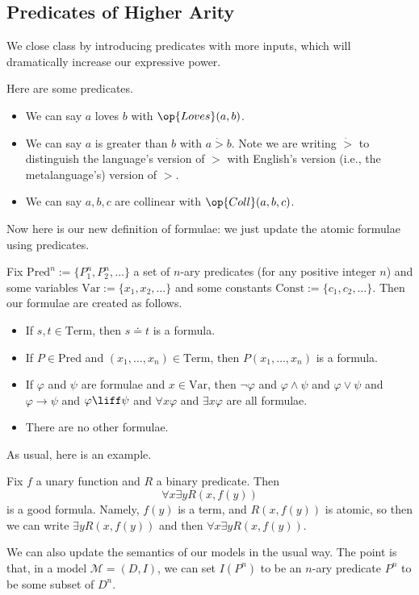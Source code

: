 \documentclass[../notes.tex]{subfiles}
\begin{document}
\subsection{Predicates of Higher Arity}
We close class by introducing predicates with more inputs, which will dramatically increase our expressive power.
\begin{example}
	Here are some predicates.
	\begin{itemize}
		\item We can say $a$ loves $b$ with $\op{Loves}(a,b)$.
		\item We can say $a$ is greater than $b$ with $a\dot{{}>{}}b$. Note we are writing $\dot>$ to distinguish the language's version of $>$ with English's version (i.e., the metalanguage's) version of $>$.
		\item We can say $a,b,c$ are collinear with $\op{Coll}(a,b,c)$.
	\end{itemize}
\end{example}
Now here is our new definition of formulae: we just update the atomic formulae using predicates.
\begin{defi}
	Fix $\mathrm{Pred}^n:=\{P_1^n,P_2^n,\ldots\}$ a set of $n$-ary predicates (for any positive integer $n$) and some variables $\mathrm{Var}:=\{x_1,x_2,\ldots\}$ and some constants $\mathrm{Const}:=\{c_1,c_2,\ldots\}$. Then our formulae are created as follows.
	\begin{itemize}
		\item If $s,t\in\mathrm{Term}$, then $s\doteq t$ is a formula.
		\item If $P\in\mathrm{Pred}$ and $(x_1,\ldots,x_n)\in\mathrm{Term}$, then $P(x_1,\ldots,x_n)$ is a formula.
		\item If $\varphi$ and $\psi$ are formulae and $x\in\mathrm{Var}$, then $\lnot\varphi$ and $\varphi\land\psi$ and $\varphi\lor\psi$ and $\varphi\to\psi$ and $\varphi\liff\psi$ and $\forall x\varphi$ and $\exists x\varphi$ are all formulae.
		\item There are no other formulae.
	\end{itemize}
\end{defi}
As usual, here is an example.
\begin{example}
	Fix $f$ a unary function and $R$ a binary predicate. Then
	\[\forall x\exists yR(x,f(y))\]
	is a good formula. Namely, $f(y)$ is a term, and $R(x,f(y))$ is atomic, so then we can write $\exists yR(x,f(y))$ and then $\forall x\exists yR(x,f(y))$.
\end{example}
We can also update the semantics of our models in the usual way. The point is that, in a model $\mathcal M=(D,I)$, we can set $I(P^n)$ to be an $n$-ary predicate $P^n$ to be some subset of $D^n$.
\end{document}
